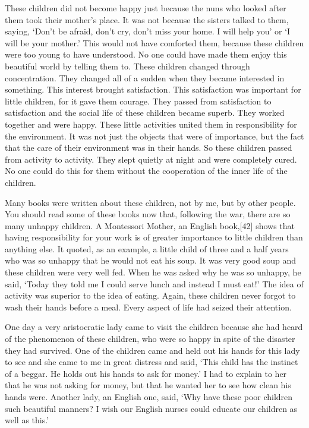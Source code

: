 \documentclass[lang=cn,10pt]{elegantbook}
\begin{document}
These children did not become happy just because the nuns
who looked after them took their mother’s place. It was not because
the sisters talked to them, saying, ‘Don’t be afraid, don’t cry, don’t
miss your home. I will help you’ or ‘I will be your mother.’ This would
not have comforted them, because these children were too young to
have understood. No one could have made them enjoy this beautiful
world by telling them to. These children changed through
concentration. They changed all of a sudden when they became
interested in something. This interest brought satisfaction. This
satisfaction was important for little children, for it gave them courage.
They passed from satisfaction to satisfaction and the social life of
these children became superb. They worked together and were
happy. These little activities united them in responsibility for the
environment. It was not just the objects that were of importance, but
the fact that the care of their environment was in their hands. So
these children passed from activity to activity. They slept quietly at
night and were completely cured. No one could do this for them
without the cooperation of the inner life of the children.

Many books were written about these children, not by me, but
by other people. You should read some of these books now that,
following the war, there are so many unhappy children. A Montessori
Mother, an English book,[42] shows that having responsibility for your
work is of greater importance to little children than anything else. It
quoted, as an example, a little child of three and a half years who
was so unhappy that he would not eat his soup. It was very good
soup and these children were very well fed. When he was asked why
he was so unhappy, he said, ‘Today they told me I could serve lunch
and instead I must eat!’ The idea of activity was superior to the idea
of eating. Again, these children never forgot to wash their hands
before a meal. Every aspect of life had seized their attention.

One day a very aristocratic lady came to visit the children
because she had heard of the phenomenon of these children, who
were so happy in spite of the disaster they had survived. One of the
children came and held out his hands for this lady to see and she
came to me in great distress and said, ‘This child has the instinct of a
beggar. He holds out his hands to ask for money.’ I had to explain to
her that he was not asking for money, but that he wanted her to see
how clean his hands were. Another lady, an English one, said, ‘Why
have these poor children such beautiful manners? I wish our English
nurses could educate our children as well as this.’
\end{document}
